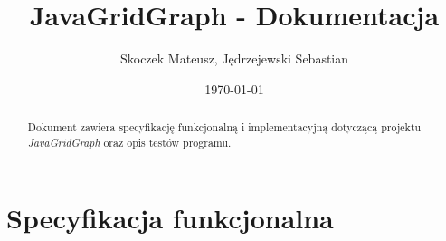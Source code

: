 \documentclass[11pt,a4paper]{report}
\title{\Huge JavaGridGraph - Dokumentacja}
\author{Skoczek Mateusz, Jędrzejewski Sebastian}
\date{\today}
\begin{document}
    \maketitle
        




    \begin{abstract}
        Dokument zawiera specyfikację funkcjonalną i implementacyjną dotyczącą projektu \textsl{JavaGridGraph} oraz opis testów programu.
    \end{abstract}





    \tableofcontents
    \thispagestyle{empty}





    \newpage
    \chapter{Specyfikacja funkcjonalna}
\end{document}
